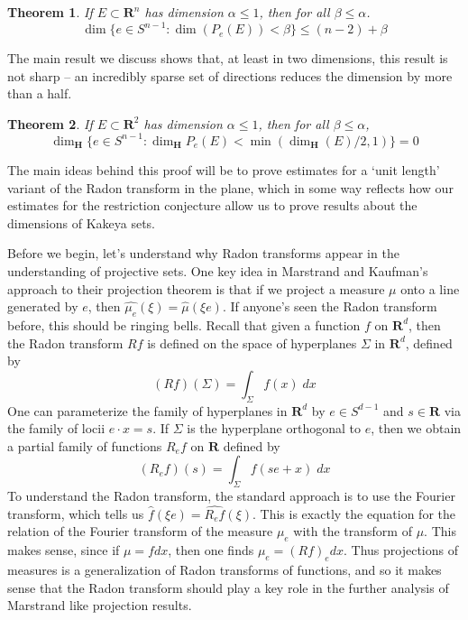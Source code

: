 \documentclass{article}
\theoremstyle{plain}
\newtheorem{theorem}{Theorem}
\theoremstyle{remark}
\theoremstyle{definition}
\begin{document}
\begin{theorem}
	If $E \subset \mathbf{R}^n$ has dimension $\alpha \leq 1$, then for all $\beta \leq \alpha$.
	\[ \dim \{ e \in S^{n-1}: \dim(P_e(E)) < \beta \} \leq (n - 2) + \beta \]
\end{theorem}

The main result we discuss shows that, at least in two dimensions, this result is not sharp -- an incredibly sparse set of directions reduces the dimension by more than a half.

\begin{theorem}
	If $E \subset \mathbf{R}^2$ has dimension $\alpha \leq 1$, then for all $\beta \leq \alpha$,
	\[ \dim_{\mathbf{H}} \{ e \in S^{n-1}: \dim_{\mathbf{H}} P_e(E) < \min(\dim_{\mathbf{H}}(E)/2,1) \} = 0 \]
\end{theorem}

The main ideas behind this proof will be to prove estimates for a `unit length' variant of the Radon transform in the plane, which in some way reflects how our estimates for the restriction conjecture allow us to prove results about the dimensions of Kakeya sets.

Before we begin, let's understand why Radon transforms appear in the understanding of projective sets. One key idea in Marstrand and Kaufman's approach to their projection theorem is that if we project a measure $\mu$ onto a line generated by $e$, then $\widehat{\mu_e}(\xi) = \widehat{\mu}(\xi e)$. If anyone's seen the Radon transform before, this should be ringing bells. Recall that given a function $f$ on $\mathbf{R}^d$, then the Radon transform $Rf$ is defined on the space of hyperplanes $\Sigma$ in $\mathbf{R}^d$, defined by
%
\[ (Rf)(\Sigma) = \int_\Sigma f(x)\; dx \]
%
One can parameterize the family of hyperplanes in $\mathbf{R}^d$ by $e \in S^{d-1}$ and $s \in \mathbf{R}$ via the family of locii $e \cdot x = s$. If $\Sigma$ is the hyperplane orthogonal to $e$, then we obtain a partial family of functions $R_ef$ on $\mathbf{R}$ defined by
%
\[ (R_ef)(s) = \int_\Sigma f(se + x)\; dx \]
%
To understand the Radon transform, the standard approach is to use the Fourier transform, which tells us $\widehat{f}(\xi e) = \widehat{R_e f}(\xi)$. This is exactly the equation for the relation of the Fourier transform of the measure $\mu_e$ with the transform of $\mu$. This makes sense, since if $\mu = f dx$, then one finds $\mu_e = (Rf)_e dx$. Thus projections of measures is a generalization of Radon transforms of functions, and so it makes sense that the Radon transform should play a key role in the further analysis of Marstrand like projection results.
\end{document}
